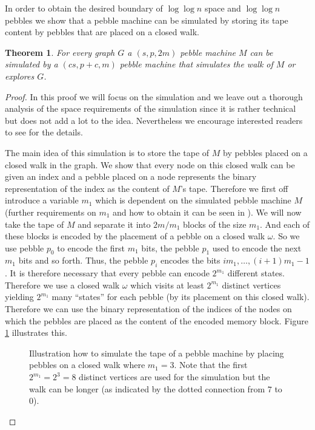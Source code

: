 \documentclass[draft,oneside]{scrartcl}
\newtheorem{thm}{Theorem}
\begin{document}
In order to obtain the desired boundary of $\log\log n$ space and $\log\log n$
pebbles we show that a pebble machine can be simulated by storing its tape
content by pebbles that are placed on a closed walk.
\begin{thm}
  \label{thm:simulation}
  For every graph $G$ a $(s,p,2m)$ pebble machine $M$ can be simulated by
  a $(cs,p + c,m)$ pebble machine that simulates the walk of $M$ or explores
  $G$.
\end{thm}
\begin{proof}
  In this proof we will focus on the simulation and we leave out a thorough
  analysis of the space requirements of the simulation since it is rather
  technical but does not add a lot to the idea. Nevertheless we encourage
  interested readers to see \cite{pebbles} for the details.

  The main idea of this simulation is to store the tape of $M$ by pebbles
  placed on a closed walk in the graph. We show that every node on this closed
  walk can be given an index and a pebble placed on a node represents the
  binary representation of the index as the content of $M$'s tape. Therefore we
  first off introduce a variable $m_{1}$ which is dependent on the simulated
  pebble machine $M$ (further requirements on $m_{1}$ and how to obtain it
  can be seen in \cite{pebbles}). We will now take the tape of $M$ and separate
  it into $2m/m_{1}$ blocks of the size $m_{1}$. And each of these blocks is
  encoded by the placement of a pebble on a closed walk $\omega$. So we use
  pebble $p_{0}$ to encode the first $m_{1}$ bits, the pebble $p_{1}$ used to
  encode the next $m_{1}$ bits and so forth. Thus, the pebble $p_{i}$ encodes
  the bits $im_{1},\dots,(i+1)m_{1}-1$. It is therefore necessary that every
  pebble can encode $2^{m_1}$ different states. Therefore we use a closed walk
  $\omega$ which visits at least $2^{m_1}$ distinct vertices yielding $2^{m_1}$
  many \enquote{states} for each pebble (by its placement on this closed walk).
  Therefore we can use the binary representation of the indices of the nodes
  on which the pebbles are placed as the content of the encoded memory block.
  Figure \ref{fig:tapesim} illustrates this.
  \begin{figure}[h!]
    \caption{Illustration how to simulate the tape of a pebble machine by
      placing pebbles on a closed walk where $m_{1} = 3$. Note that the first
      $2^{m_{1}}=2^{3}=8$ distinct vertices are used for the simulation but the
    walk can be longer (as indicated by the dotted connection from $7$ to $0$).}
    \label{fig:tapesim}
    \begin{center}
      \resizebox{0.6\textwidth}{!}{}
    \end{center}
  \end{figure}


\end{proof}
\end{document}
